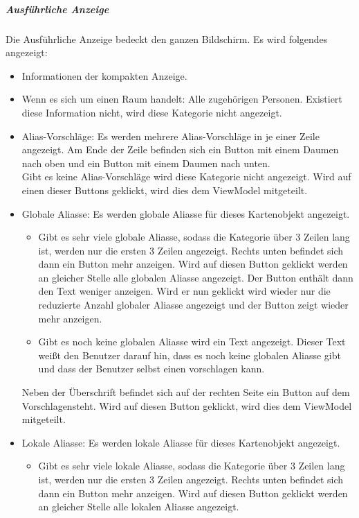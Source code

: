\subparagraph*{Ausführliche Anzeige}
Die Ausführliche Anzeige bedeckt den ganzen Bildschirm.
Es wird folgendes angezeigt:
\begin{itemize}
    \item Informationen der kompakten Anzeige.
    \item Wenn es sich um einen Raum handelt: Alle zugehörigen Personen. 
    Existiert diese Information nicht, wird diese Kategorie nicht angezeigt.
    \item Alias-Vorschläge: Es werden mehrere Alias-Vorschläge in je einer Zeile angezeigt. 
    Am Ende der Zeile befinden sich ein Button mit einem Daumen nach oben und ein Button mit einem Daumen nach unten.\\
    Gibt es keine Alias-Vorschläge wird diese Kategorie nicht angezeigt. 
    Wird auf einen dieser Buttons geklickt, wird dies dem ViewModel mitgeteilt.
    \item Globale Aliasse: Es werden globale Aliasse für dieses Kartenobjekt angezeigt.
    \begin{itemize}
        \item Gibt es sehr viele globale Aliasse, sodass die Kategorie über 3 Zeilen lang ist, werden nur 
        die ersten 3 Zeilen angezeigt. Rechts unten befindet sich dann ein Button \dq mehr anzeigen\dq . 
        Wird auf diesen Button geklickt werden an gleicher Stelle  alle globalen Aliasse angezeigt. 
        Der Button enthält dann den Text \dq weniger anzeigen\dq . Wird er nun geklickt wird wieder nur die 
        reduzierte Anzahl globaler Aliasse angezeigt und der Button zeigt wieder \dq mehr anzeigen\dq.
        \item Gibt es noch keine globalen Aliasse wird ein Text angezeigt. Dieser Text weißt den Benutzer 
        darauf hin, dass es noch keine globalen Aliasse gibt und dass der Benutzer selbst einen vorschlagen kann.
    \end{itemize}
    Neben der Überschrift befindet sich auf der rechten Seite ein Button auf dem \dq Vorschlagen\dq  steht.
    Wird auf diesen Button geklickt, wird dies dem ViewModel mitgeteilt.
    \item Lokale Aliasse: Es werden lokale Aliasse für dieses Kartenobjekt angezeigt. 
    \begin{itemize}
        \item Gibt es sehr viele lokale Aliasse, sodass die Kategorie über 3 Zeilen lang ist, werden nur 
        die ersten 3 Zeilen angezeigt. Rechts unten befindet sich dann ein Button \dq mehr anzeigen\dq . 
        Wird auf diesen Button geklickt werden an gleicher Stelle  alle lokalen Aliasse angezeigt. 

\end{itemize}
\end{itemize}
